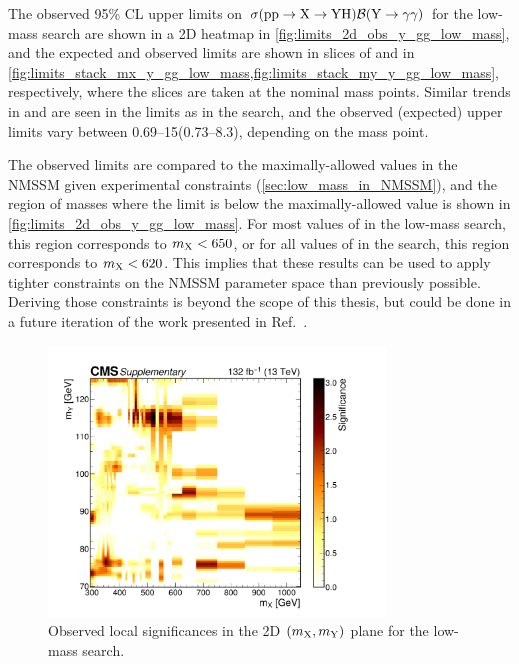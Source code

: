 The observed 95\% CL upper limits on $\sigma(\mathrm{p}\mathrm{p} \to \mathrm{X} \to \mathrm{Y}\mathrm{H})\mathcal{B}(\mathrm{Y} \to \gamma\gamma)$ for the low-mass \XYggHtt search are shown in a 2D heatmap in \cref{fig:limits_2d_obs_y_gg_low_mass}, and the expected and observed limits are shown in slices of \mX and \mY in \cref{fig:limits_stack_mx_y_gg_low_mass,fig:limits_stack_my_y_gg_low_mass}, respectively, where the slices are taken at the nominal mass points. Similar trends in \mX and \mY are seen in the limits as in the \XYttHgg search, and the observed (expected) upper limits vary between 0.69--15\fb (0.73--8.3\fb), depending on the mass point. 

The observed limits are compared to the maximally-allowed values in the NMSSM given experimental constraints (\cref{sec:low_mass_in_NMSSM}), and the region of masses where the limit is below the maximally-allowed value is shown in \cref{fig:limits_2d_obs_y_gg_low_mass}. For most values of \mY in the low-mass \XYggHtt search, this region corresponds to $m_{\mathrm{X}} < 650$\GeV, or for all values of \mY in the search, this region corresponds to $m_{\mathrm{X}} < 620$\GeV. This implies that these results can be used to apply tighter constraints on the NMSSM parameter space than previously possible. Deriving those constraints is beyond the scope of this thesis, but could be done in a future iteration of the work presented in Ref.~\cite{Ellwanger:2022jtd}.

\begin{figure}
    \centering
    \includegraphics[width=0.8\textwidth]{Figures/Dihiggs/results/significances/significance_y_gg_low_mass_supplementary.pdf}
    \caption[Low-Mass \XYggHtt Observed Local Significances]{Observed local significances in the 2D $(m_{\mathrm{X}},m_{\mathrm{Y}})$ plane for the low-mass \XYggHtt search.}\label{fig:significance_y_gg_low_mass}
\end{figure}

